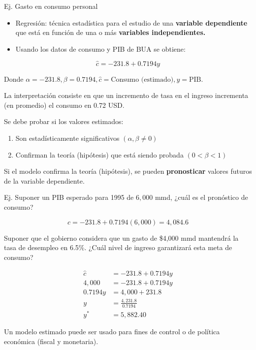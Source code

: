 \documentclass[
]{book}
\providecommand{\tightlist}{%
  \setlength{\itemsep}{0pt}\setlength{\parskip}{0pt}}
\begin{document}
Ej. Gasto en consumo personal

\begin{itemize}
\tightlist
\item
  Regresión: técnica estadística para el estudio de una \textbf{variable dependiente} que está en función de una o más \textbf{variables independientes.}
\item
  Usando los datos de consumo y PIB de BUA se obtiene:
\end{itemize}

\[ 
\hat c = -231.8 + 0.7194 y
\]

Donde \(\alpha = -231.8, \beta = 0.7194, \hat c = \text{Consumo (estimado)}, y = \text{PIB}\).

La interpretación consiste en que un incremento de tasa en el ingreso incrementa (en promedio) el consumo en 0.72 USD.

Se debe probar si los valores estimados:

\begin{enumerate}
\def\labelenumi{\arabic{enumi}.}
\tightlist
\item
  Son estadísticamente significativos \((\alpha, \beta \neq 0)\)\\
\item
  Confirman la teoría (hipótesis) que está siendo probada \((0<\beta<1)\)
\end{enumerate}

Si el modelo confirma la teoría (hipótesis), se pueden \textbf{pronosticar} valores futuros de la variable dependiente.

Ej. Suponer un PIB esperado para 1995 de \(6,000\) mmd, ¿cuál es el pronóstico de consumo?

\[
\hat c = -231.8 + 0.7194(6,000) = 4,084.6 
\]

Suponer que el gobierno considera que un gasto de \$4,000 mmd mantendrá la tasa de desempleo en 6.5\%. ¿Cuál nivel de ingreso garantizará esta meta de consumo?

\[
\begin{aligned} 
\hat c &= -231.8 + 0.7194y \\
4,000 &= -231.8 + 0.7194y \\ 
0.7194y &= 4,000 + 231.8 \\ 
y &= \frac{4,231.8}{0.7194} \\ 
y^* &= 5,882.40 
\end{aligned}
\]

Un modelo estimado puede ser usado para fines de control o de política económica (fiscal y monetaria).
\end{document}
